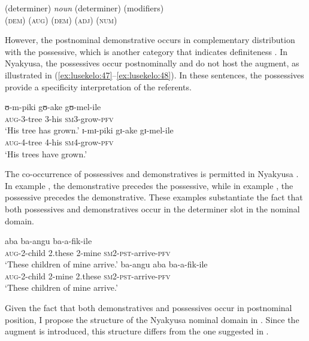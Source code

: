 \documentclass[output=paper]{langscibook}
\begin{document}
\ea \label{ex:lusekelo:46} 
\gll (determiner)  \textit{noun}  (determiner)  (modifiers)\\
  {(\textsc{dem}) (\textsc{aug})}  {}  (\textsc{dem})  {(\textsc{adj}) (\textsc{num})}\\
\z

{However, the postnominal demonstrative occurs in complementary distribution with the possessive, which is another category that indicates definiteness \citep{Lyons1999}. In Nyakyusa, the possessives occur postnominally and do not host the augment, as illustrated in (\ref{ex:lusekelo:47}--\ref{ex:lusekelo:48}). In these sentences, the possessives provide a specificity interpretation of the referents.} 

\ea%
    \label{ex:lusekelo:47}
\gll   ʊ-m-piki  gʊ-ake   gʊ-mel-ile\\
  \textsc{aug}-3-tree  3-his  \textsc{sm}3-grow-\textsc{pfv}  \\
\glt  ‘His tree has grown.’
\ex%
    \label{ex:lusekelo:48}
\gll  ɪ{}-mɪ{}-piki    gɪ{}-ake   gɪ{}-mel-ile\\
  \textsc{aug}-4-tree  4-his  \textsc{sm}4-grow-\textsc{pfv}  \\
\glt  ‘His trees have grown.’
\z

The co-occurrence of possessives and demonstratives is permitted in Nyakyusa \citep{Lusekelo2009}. In example , the demonstrative precedes the possessive, while in example , the possessive precedes the demonstrative. These examples substantiate the fact that both possessives and demonstratives occur in the determiner slot in the nominal domain.  

\ea\label{ex:lusekelo:49}
  {aba}  {ba-angu}  {ba-a-fik-ile}\\
  \textsc{aug}-2-child  2.these  2-mine  \textsc{sm}2-\textsc{pst}-arrive-\textsc{pfv}\\
\glt  ‘These children of mine arrive.’
\ex\label{ex:lusekelo:50}
  {ba-angu}  {aba}  {ba-a-fik-ile}\\
  \textsc{aug}-2-child  2-mine  2.these  \textsc{sm}2-\textsc{pst}-arrive-\textsc{pfv}\\
\glt  ‘These children of mine arrive.’
\z

Given the fact that both demonstratives and possessives occur in postnominal position, I propose the structure of the Nyakyusa nominal domain in . Since the augment is introduced, this structure differs from the one suggested in \citet{Lusekelo2009}.
\end{document}
